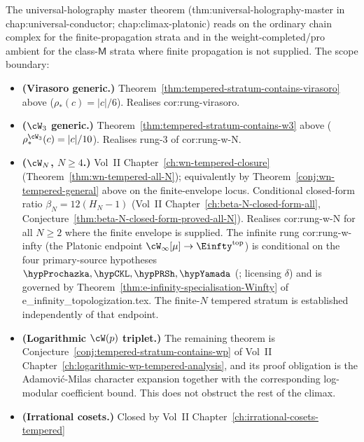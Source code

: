 \begin{remark}%
\label{rem:anchor-tempered-stratum-master}%
%
%
%
The universal-holography master theorem
(\textsf{thm:universal-holography-master} in
\textsf{chap:universal-conductor}; \textsf{chap:climax-platonic})
reads on the ordinary chain complex for the finite-propagation strata
and in the weight-completed/pro ambient for the class-\(\mathsf M\)
strata where finite propagation is not supplied. The scope boundary:
\begin{itemize}[nosep]
\item \textbf{(Virasoro generic.)}
 Theorem~\ref{thm:tempered-stratum-contains-virasoro} above
 ($\rho_*(c) = |c|/6$). Realises \textsf{cor:rung-virasoro}.
\item \textbf{($\cW_3$ generic.)}
 Theorem~\ref{thm:tempered-stratum-contains-w3} above
 ($\rho_*^{\cW_3}(c) = |c|/10$). Realises rung-3 of
 \textsf{cor:rung-w-N}.
\item \textbf{($\cW_N$, $N \ge 4$.)}
 Vol~II Chapter~\ref{ch:wn-tempered-closure}
 (Theorem~\ref{thm:wn-tempered-all-N}); equivalently by
 Theorem~\ref{conj:wn-tempered-general} above on the finite-envelope
 locus. Conditional closed-form ratio
 $\beta_N = 12(H_N - 1)$ (Vol~II
 Chapter~\ref{ch:beta-N-closed-form-all},
 Conjecture~\ref{thm:beta-N-closed-form-proved-all-N}). Realises
 \textsf{cor:rung-w-N} for all $N \ge 2$ where the finite envelope is
 supplied. The infinite rung \textsf{cor:rung-w-infty}
 (the Platonic endpoint $\cW_\infty[\mu]\to\Einfty^{\mathrm{top}}$)
 is conditional on the four primary-source hypotheses
 $\hypProchazka, \hypCKL, \hypPRSh, \hypYamada$
 (\cite{ProchazkaRapcak18,CKL-parafermion,PopeRomansShen-winfty-wedge,
 Bakas-Winfty,Yamada}; licensing $\delta$) and is governed by
 Theorem~\textup{\ref{thm:e-infinity-specialisation-Winfty}} of
 \textsf{e\_infinity\_topologization.tex}. The finite-$N$ tempered
 stratum is established independently of that endpoint.
\item \textbf{(Logarithmic $\cW(p)$ triplet.)} The remaining theorem is
 Conjecture~\ref{conj:tempered-stratum-contains-wp} of Vol~II
 Chapter~\ref{ch:logarithmic-wp-tempered-analysis},
 and its proof obligation is the Adamovi\'c-Milas character expansion
 together with the corresponding log-modular coefficient bound. This does not
 obstruct the rest of the climax.
\item \textbf{(Irrational cosets.)} Closed by Vol~II
 Chapter~\ref{ch:irrational-cosets-tempered}

\end{itemize}
\end{remark}
